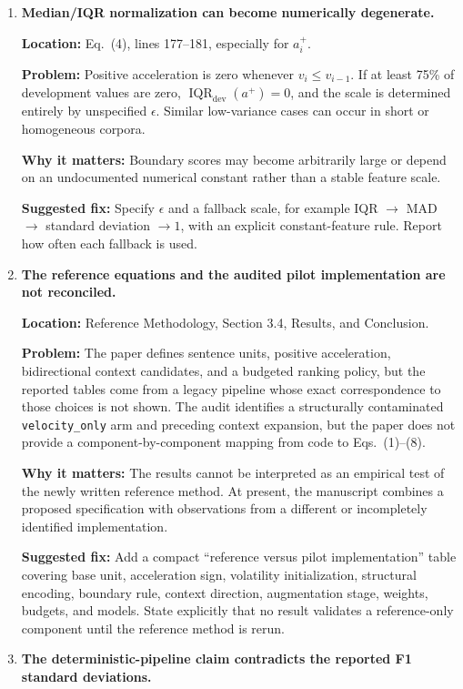 \documentclass[11pt]{article}
\newcommand{\location}[1]{\textbf{Location:} #1}
\newcommand{\problem}{\textbf{Problem:} }
\newcommand{\impact}{\textbf{Why it matters:} }
\newcommand{\fix}{\textbf{Suggested fix:} }
\begin{document}
\begin{enumerate}
  \item \textbf{Median/IQR normalization can become numerically degenerate.}

  \location{Eq.~(4), lines 177--181, especially for $a_i^+$.}

  \problem Positive acceleration is zero whenever $v_i\leq v_{i-1}$. If at least 75\% of development values are zero, $\operatorname{IQR}_{\mathrm{dev}}(a^+)=0$, and the scale is determined entirely by unspecified $\epsilon$. Similar low-variance cases can occur in short or homogeneous corpora.

  \impact Boundary scores may become arbitrarily large or depend on an undocumented numerical constant rather than a stable feature scale.

  \fix Specify $\epsilon$ and a fallback scale, for example IQR $\rightarrow$ MAD $\rightarrow$ standard deviation $\rightarrow 1$, with an explicit constant-feature rule. Report how often each fallback is used.

  \item \textbf{The reference equations and the audited pilot implementation are not reconciled.}

  \location{Reference Methodology, Section 3.4, Results, and Conclusion.}

  \problem The paper defines sentence units, positive acceleration, bidirectional context candidates, and a budgeted ranking policy, but the reported tables come from a legacy pipeline whose exact correspondence to those choices is not shown. The audit identifies a structurally contaminated \texttt{velocity\_only} arm and preceding context expansion, but the paper does not provide a component-by-component mapping from code to Eqs.~(1)--(8).

  \impact The results cannot be interpreted as an empirical test of the newly written reference method. At present, the manuscript combines a proposed specification with observations from a different or incompletely identified implementation.

  \fix Add a compact ``reference versus pilot implementation'' table covering base unit, acceleration sign, volatility initialization, structural encoding, boundary rule, context direction, augmentation stage, weights, budgets, and models. State explicitly that no result validates a reference-only component until the reference method is rerun.

  \item \textbf{The deterministic-pipeline claim contradicts the reported F1 standard deviations.}


\end{enumerate}
\end{document}
